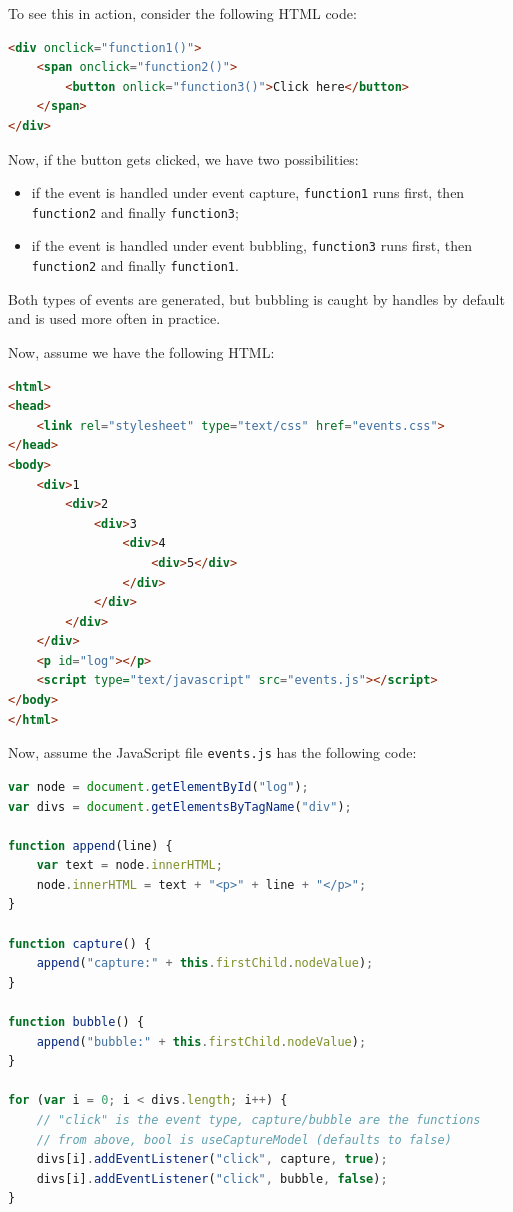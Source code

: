\documentclass[a4paper, openany]{memoir}
\begin{document}
To see this in action, consider the following HTML code:
\begin{lstlisting}[language=html]
<div onclick="function1()">
    <span onclick="function2()">
        <button onlick="function3()">Click here</button>
    </span>
</div>
\end{lstlisting}
Now, if the button gets clicked, we have two possibilities:
\begin{itemize}
    \item if the event is handled under event capture, \texttt{function1} runs first, then \texttt{function2} and finally \texttt{function3};
    \item if the event is handled under event bubbling, \texttt{function3} runs first, then \texttt{function2} and finally \texttt{function1}.
\end{itemize}
Both types of events are generated, but bubbling is caught by handles by default and is used more often in practice.

Now, assume we have the following HTML:
\begin{lstlisting}[language=html]
<html>
<head>
    <link rel="stylesheet" type="text/css" href="events.css">
</head>
<body>
    <div>1
        <div>2
            <div>3
                <div>4
                    <div>5</div> 
                </div>
            </div>
        </div>
    </div>
    <p id="log"></p>
    <script type="text/javascript" src="events.js"></script>
</body>
</html>
\end{lstlisting}
Now, assume the JavaScript file \texttt{events.js} has the following code:
\begin{lstlisting}[language=javascript]
var node = document.getElementById("log");
var divs = document.getElementsByTagName("div");

function append(line) {
    var text = node.innerHTML;
    node.innerHTML = text + "<p>" + line + "</p>";
}

function capture() {
    append("capture:" + this.firstChild.nodeValue);
}

function bubble() {
    append("bubble:" + this.firstChild.nodeValue);
}

for (var i = 0; i < divs.length; i++) {
    // "click" is the event type, capture/bubble are the functions 
    // from above, bool is useCaptureModel (defaults to false)
    divs[i].addEventListener("click", capture, true);
    divs[i].addEventListener("click", bubble, false);
}
\end{lstlisting}
\end{document}
